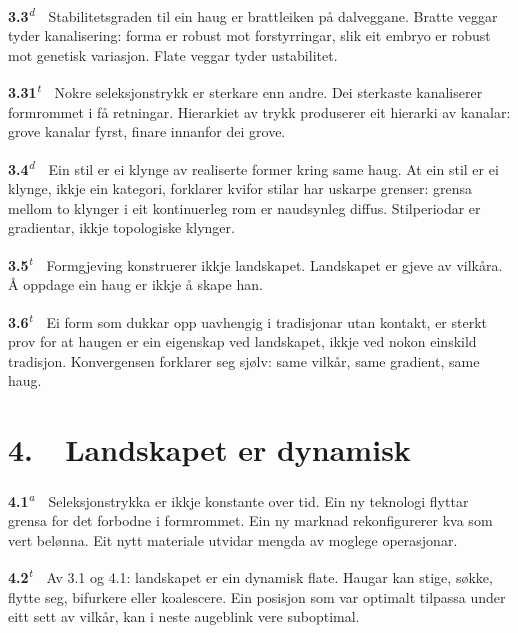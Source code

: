 \documentclass[10pt]{article}
\begin{document}
\noindent\textbf{3.3}\textsuperscript{\textit{d}}~~Stabilitetsgraden til ein haug er brattleiken på dalveggane. Bratte veggar tyder kanalisering: forma er robust mot forstyrringar, slik eit embryo er robust mot genetisk variasjon. Flate veggar tyder ustabilitet.




\noindent\textbf{3.31}\textsuperscript{\textit{t}}~~Nokre seleksjonstrykk er sterkare enn andre. Dei sterkaste kanaliserer formrommet i få retningar. Hierarkiet av trykk produserer eit hierarki av kanalar: grove kanalar fyrst, finare innanfor dei grove.




\noindent\textbf{3.4}\textsuperscript{\textit{d}}~~Ein stil er ei klynge av realiserte former kring same haug. At ein stil er ei klynge, ikkje ein kategori, forklarer kvifor stilar har uskarpe grenser: grensa mellom to klynger i eit kontinuerleg rom er naudsynleg diffus. Stilperiodar er gradientar, ikkje topologiske klynger.




\noindent\textbf{3.5}\textsuperscript{\textit{t}}~~Formgjeving konstruerer ikkje landskapet. Landskapet er gjeve av vilkåra. Å oppdage ein haug er ikkje å skape han.




\noindent\textbf{3.6}\textsuperscript{\textit{t}}~~Ei form som dukkar opp uavhengig i tradisjonar utan kontakt, er sterkt prov for at haugen er ein eigenskap ved landskapet, ikkje ved nokon einskild tradisjon. Konvergensen forklarer seg sjølv: same vilkår, same gradient, same haug.







\chapter*{4.~~Landskapet er dynamisk}




\noindent\textbf{4.1}\textsuperscript{\textit{a}}~~Seleksjonstrykka er ikkje konstante over tid. Ein ny teknologi flyttar grensa for det forbodne i formrommet. Ein ny marknad rekonfigurerer kva som vert belønna. Eit nytt materiale utvidar mengda av moglege operasjonar.




\noindent\textbf{4.2}\textsuperscript{\textit{t}}~~Av 3.1 og 4.1: landskapet er ein dynamisk flate. Haugar kan stige, søkke, flytte seg, bifurkere eller koalescere. Ein posisjon som var optimalt tilpassa under eitt sett av vilkår, kan i neste augeblink vere suboptimal.
\end{document}
